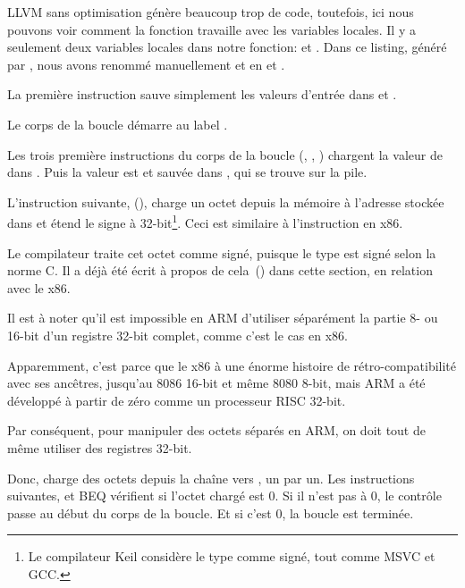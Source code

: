 ﻿

\mysubparagraph{\NonOptimizingXcodeIV (\ARMMode)}



LLVM sans optimisation génère beaucoup trop de code, toutefois, ici nous pouvons
voir comment la fonction travaille avec les variables locales.
Il y a seulement deux variables locales dans notre fonction:  et .
Dans ce listing, généré par \IDA, nous avons renommé manuellement  et
 en  et .

La première instruction sauve simplement les valeurs d'entrée dans  et .

Le corps de la boucle démarre au label .

Les trois première instructions du corps de la boucle (, \ADD, )
chargent la valeur de  dans .
Puis la valeur est  et sauvée dans , qui
se trouve sur la pile.

L'instruction suivante,  (), charge
un octet depuis la mémoire à l'adresse stockée dans  et étend le signe à
32-bit\footnote{Le compilateur Keil considère le type \Tchar comme signé, tout
comme MSVC et GCC.}.
Ceci est similaire à l'instruction \MOVSX en x86.

Le compilateur traite cet octet comme signé, puisque le type \Tchar est signé selon
la norme C.
Il a déjà été écrit à propos de cela~() dans cette section, en relation
avec le x86.


Il est à noter qu'il est impossible en ARM d'utiliser séparément la partie 8- ou
16-bit d'un registre 32-bit complet, comme c'est le cas en x86.

Apparemment, c'est parce que le x86 à une énorme histoire de rétro-compatibilité
avec ses ancêtres, jusqu'au 8086 16-bit et même 8080 8-bit, mais ARM a été développé
à partir de zéro comme un processeur RISC 32-bit.

Par conséquent, pour manipuler des octets séparés en ARM, on doit tout de même utiliser
des registres 32-bit.

Donc,  charge des octets depuis la chaîne vers , un par un.
Les instructions suivantes, \CMP et \ac{BEQ} vérifient si l'octet chargé est 0.
Si il n'est pas à 0, le contrôle passe au début du corps de la boucle.
Et si c'est 0, la boucle est terminée.

